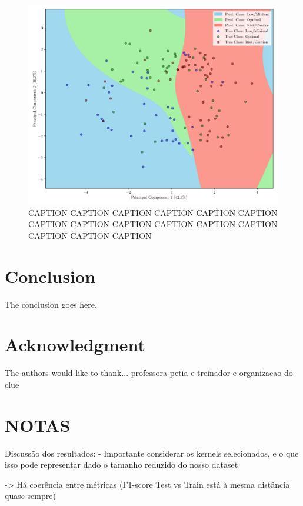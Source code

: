 \documentclass[conference]{IEEEtran}
\begin{document}
\begin{figure}[H]
    \centering
    \includegraphics[width=1\linewidth]{assets/pca_svm.png}
    \caption{CAPTION CAPTION CAPTION CAPTION CAPTION CAPTION CAPTION CAPTION CAPTION CAPTION CAPTION CAPTION CAPTION CAPTION CAPTION}
    \label{pca_reglog}
\end{figure}




\section{Conclusion}

The conclusion goes here.

\section*{Acknowledgment}


The authors would like to thank... professora petia e treinador e organizacao do clue


\section{NOTAS}

Discussão dos resultados:
-\> Importante considerar os kernels selecionados, e o que isso pode representar dado o tamanho reduzido do nosso dataset

-> Há coerência entre métricas (F1-score Test vs Train está à mesma distância quase sempre)
\end{document}
